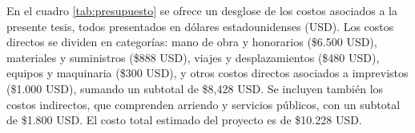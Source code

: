 %
%

En el cuadro \ref{tab:presupuesto} se ofrece un desglose de los costos asociados a la presente tesis, todos presentados en dólares estadounidenses (USD). Los costos directos se dividen en categorías: mano de obra y honorarios (\$6.500 USD), materiales y suministros (\$888 USD), viajes y desplazamientos (\$480 USD), equipos y maquinaria (\$300 USD), y otros costos directos asociados a imprevistos (\$1.000 USD), sumando un subtotal de \$8,428 USD. Se incluyen también los costos indirectos, que comprenden arriendo y servicios públicos, con un subtotal de \$1.800 USD. El costo total estimado del proyecto es de \$10.228 USD. 

